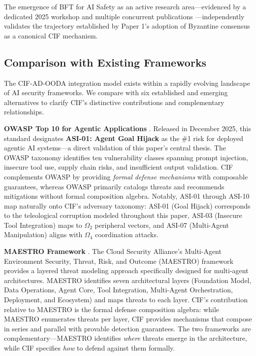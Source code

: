 \documentclass[
]{article}
\begin{document}
The emergence of BFT for AI Safety as an active research
area---evidenced by a dedicated 2025 workshop and multiple concurrent
publications \cite{jo2025byzantine}---independently validates the
trajectory established by Paper 1's adoption of Byzantine consensus as a
canonical CIF mechanism.

\subsection{Comparison with Existing
Frameworks}\label{comparison-with-existing-frameworks}

The CIF-AD-OODA integration model exists within a rapidly evolving
landscape of AI security frameworks. We compare with six established and
emerging alternatives to clarify CIF's distinctive contributions and
complementary relationships.

\textbf{OWASP Top 10 for Agentic Applications} \cite{owasp2025agentic}.
Released in December 2025, this standard designates \textbf{ASI-01:
Agent Goal Hijack} as the \#1 risk for deployed agentic AI systems---a
direct validation of this paper's central thesis. The OWASP taxonomy
identifies ten vulnerability classes spanning prompt injection, insecure
tool use, supply chain risks, and insufficient output validation. CIF
complements OWASP by providing \emph{formal defense mechanisms} with
composable guarantees, whereas OWASP primarily catalogs threats and
recommends mitigations without formal composition algebra. Notably,
ASI-01 through ASI-10 map naturally onto CIF's adversary taxonomy:
ASI-01 (Goal Hijack) corresponds to the teleological corruption modeled
throughout this paper, ASI-03 (Insecure Tool Integration) maps to
\(\Omega_2\) peripheral vectors, and ASI-07 (Multi-Agent Manipulation)
aligns with \(\Omega_4\) coordination attacks.

\textbf{MAESTRO Framework} \cite{csa2025maestro}. The Cloud Security
Alliance's Multi-Agent Environment Security, Threat, Risk, and Outcome
(MAESTRO) framework provides a layered threat modeling approach
specifically designed for multi-agent architectures. MAESTRO identifies
seven architectural layers (Foundation Model, Data Operations, Agent
Core, Tool Integration, Multi-Agent Orchestration, Deployment, and
Ecosystem) and maps threats to each layer. CIF's contribution relative
to MAESTRO is the formal defense composition algebra: while MAESTRO
enumerates threats per layer, CIF provides mechanisms that compose in
series and parallel with provable detection guarantees. The two
frameworks are complementary---MAESTRO identifies \emph{where} threats
emerge in the architecture, while CIF specifies \emph{how} to defend
against them formally.
\end{document}
